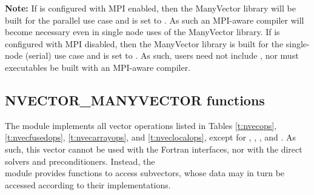 \warn\textbf{Note:} If {\sundials} is configured with MPI enabled, then the
ManyVector library will be built for the parallel use case and 
is set to . As such an MPI-aware compiler will become necessary
even in single node uses of the ManyVector library. If {\sundials} is configured
with MPI disabled, then the ManyVector library is built for the single-node
(serial) use case and  is set to . As such, users need
not include , nor must executables be built with an MPI-aware
compiler.


\subsection{NVECTOR\_MANYVECTOR functions}
\label{ss:nvec_manyvector_functions}

The {\nvecmanyvector} module implements all vector operations listed 
in Tables \ref{t:nvecops}, \ref{t:nvecfusedops}, \ref{t:nvecarrayops},
and \ref{t:nveclocalops}, except for ,
, , and
.  As such, this vector cannot be
used with the {\sundials} Fortran interfaces, nor with the {\sundials}
direct solvers and preconditioners. Instead, the \\
{\nvecmanyvector} module provides functions to access subvectors,
whose data may in turn be accessed according to their {\nvector}
implementations.

